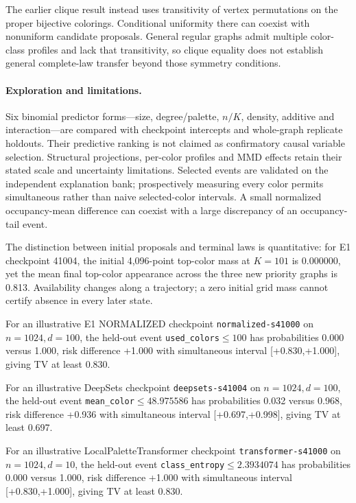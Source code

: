 The earlier clique result instead uses transitivity of vertex permutations
on the proper bijective colorings. Conditional uniformity there can coexist
with nonuniform candidate proposals. General regular graphs admit multiple
color-class profiles and lack that transitivity, so clique equality does
not establish general complete-law transfer beyond those symmetry conditions.

\paragraph{Exploration and limitations.}
Six binomial predictor forms---size, degree/palette, $n/K$, density, additive
and interaction---are compared with checkpoint intercepts and whole-graph
replicate holdouts. Their predictive ranking is not claimed as confirmatory
causal variable selection. Structural projections, per-color profiles and
MMD effects retain their stated scale and uncertainty limitations. Selected
events are validated on the independent explanation bank; prospectively
measuring every color permits simultaneous rather than naive selected-color
intervals. A small normalized occupancy-mean difference can coexist with a
large discrepancy of an occupancy-tail event.

The distinction between initial proposals and terminal laws is quantitative:
for E1 checkpoint 41004, the initial 4,096-point top-color mass
at $K=101$ is 0.000000, yet the mean final top-color appearance across
the three new priority graphs is 0.813.
Availability changes along a trajectory; a zero initial grid mass cannot
certify absence in every later state.

For an illustrative E1 NORMALIZED checkpoint
\texttt{normalized-s41000} on $n=1024,d=100$,
the held-out event \texttt{used\_colors}$\le 100$ has probabilities
0.000 versus 1.000, risk difference
+1.000 with simultaneous interval
[+0.830,+1.000], giving TV at least 0.830.

For an illustrative DeepSets checkpoint
\texttt{deepsets-s41004} on $n=1024,d=100$,
the held-out event \texttt{mean\_color}$\le 48.975586$ has probabilities
0.032 versus 0.968, risk difference
+0.936 with simultaneous interval
[+0.697,+0.998], giving TV at least 0.697.

For an illustrative LocalPaletteTransformer checkpoint
\texttt{transformer-s41000} on $n=1024,d=10$,
the held-out event \texttt{class\_entropy}$\le 2.3934074$ has probabilities
0.000 versus 1.000, risk difference
+1.000 with simultaneous interval
[+0.830,+1.000], giving TV at least 0.830.

